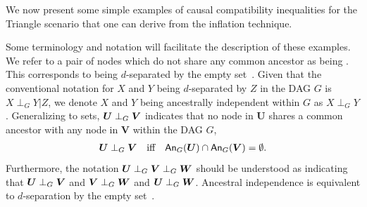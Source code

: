 
\color{black} 

We now present some simple examples of causal compatibility inequalities for the Triangle scenario that one can derive from the inflation technique. 

Some terminology and notation will facilitate the description of these examples. We refer to a pair of nodes which do not share any common ancestor as being . This corresponds to being $d$-separated by the empty set~\cite{pearl2009causality,spirtes2011causation,studeny2005probabilistic,koller2009probabilistic}.  Given that the conventional notation for $X$ and $Y$ being $d$-separated by $Z$ in the DAG $G$ is $X\perp_G Y|Z$, we denote $X$ and $Y$ being ancestrally independent within $G$ as $X\perp_G Y$.  Generalizing to sets, $\bm{U}\aindep_G \bm{V}$ indicates that no node in $\bm{U}$ shares a common ancestor with any node in $\bm{V}$ within the DAG $G$, 
\begin{align}
\bm{U}\aindep_G \bm{V} \quad \text{iff} \quad \An[G]{\bm{U}}\cap\An[G]{\bm{V}}=\emptyset.
\end{align}
Furthermore, the notation ${\bm{U}\aindep_G \bm{V}\aindep_G \bm{W}}$ should be understood as indicating that $\bm{U}\aindep_G \bm{V}$ and $\bm{V}\aindep_G \bm{W}$ and $\bm{U}\aindep_G \bm{W}$.
Ancestral independence is equivalent to $d$-separation by the empty set~\cite{pearl2009causality,spirtes2011causation,studeny2005probabilistic,koller2009probabilistic}. 




